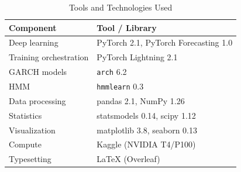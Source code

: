 \begin{table}[!htbp]
\caption{Tools and Technologies Used}
\label{tab:tools}
\centering
\begin{tabular}{ll}
\hline
\textbf{Component} & \textbf{Tool / Library} \\
\hline
Deep learning & PyTorch 2.1, PyTorch Forecasting 1.0 \\
Training orchestration & PyTorch Lightning 2.1 \\
GARCH models & \texttt{arch} 6.2 \\
HMM & \texttt{hmmlearn} 0.3 \\
Data processing & pandas 2.1, NumPy 1.26 \\
Statistics & statsmodels 0.14, scipy 1.12 \\
Visualization & matplotlib 3.8, seaborn 0.13 \\
Compute & Kaggle (NVIDIA T4/P100) \\
Typesetting & \LaTeX{} (Overleaf) \\
\hline
\end{tabular}
\end{table}
